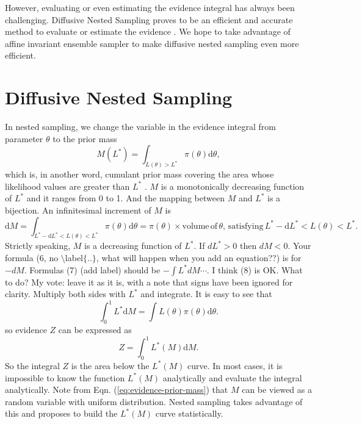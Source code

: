 \documentclass[letterpaper, preprint]{aastex}
\newcommand{\qer}[1]{{\color{red}#1}}
\begin{document}
However, evaluating or even estimating the evidence integral has always been challenging. Diffusive Nested Sampling proves to be an efficient and accurate method to evaluate or estimate the evidence \citep{brewer11a}. We hope to take advantage of affine invariant ensemble sampler \citep{goodman10a} to make diffusive nested sampling even more efficient.


\section{Diffusive Nested Sampling}

In nested sampling, we change the variable in the evidence integral from parameter $\theta$ to the prior mass
\begin{equation}
M(L^*)=\int_{L(\theta)>L^*}\!\pi(\theta)\mathrm{d}\theta,
 \label{eq:prior-mass}
\end{equation}
which is, in another word, cumulant prior mass covering the area whose likelihood values are greater than $L^*$ \citep{skilling06a}. $M$ is a monotonically decreasing function of $L^*$ and it ranges from 0 to 1. And the mapping between $M$ and $L^*$ is a bijection. An infinitesimal increment of $M$ is
\begin{equation}
\mathrm{d}M=\int_{L^*-\mathrm{d}L^*<L(\theta)<L^*}\!\pi(\theta)\mathrm{d}\theta = \pi(\theta)\times \mathrm{volume\,of}\,\theta,\,\mathrm{satisfying}\, L^*-\mathrm{d}L^*<L(\theta)<L^*.
\end{equation}
\qer{Strictly speaking, $M$ is a decreasing function of $L^*$.  
If $dL^* > 0$ then $dM<0$.
Your formula (6, no $\setminus$label$\{..\}$, what will happen when you add an equation??) is for 
$-dM$.
Formulas (7) (add label) should be $-\int L^*dM\cdots$.
I think (8) is OK.
What to do?
My vote: leave it as it is, with a note that signs have been ignored for clarity.}
Multiply both sides with $L^*$ and integrate. It is easy to see that
\begin{equation}
\int^1_0\! L^*\mathrm{d}M=\int\!L(\theta)\pi(\theta)\mathrm{d}\theta.
\end{equation}
so evidence $Z$ can be expressed as
\begin{equation}
Z=\int^1_0\! L^*(M)\mathrm{d}M.
 \label{eq:evidence-prior-mass}
\end{equation}
So the integral $Z$ is the area below the $L^*(M)$ curve. In most cases, it is impossible to know the function $L^*(M)$ analytically and evaluate the integral analytically. Note from Eqn. (\ref{eq:evidence-prior-mass}) that $M$ can be viewed as a random variable with uniform distribution. Nested sampling takes advantage of this and proposes to build the $L^*(M)$ curve statistically.
\end{document}

